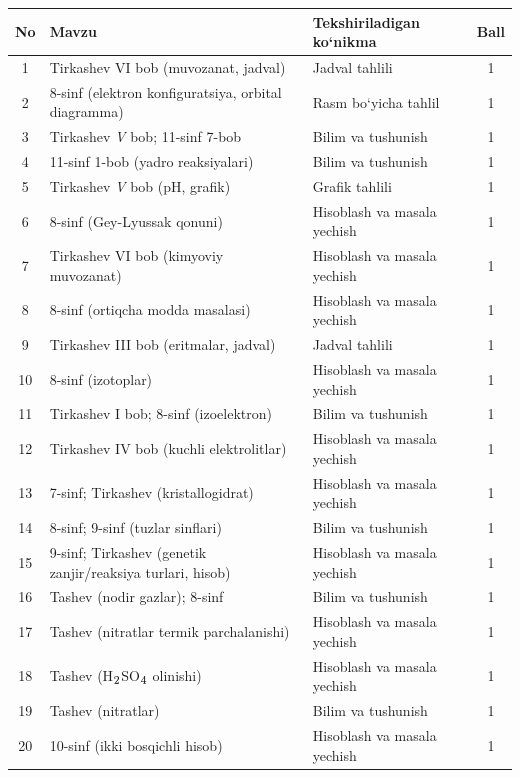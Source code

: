 \documentclass[11pt,a4paper]{article}
\renewcommand{\textsubscript}[1]{\ensuremath{_{\text{\fontsize{8}{8}\selectfont #1}}}}
\begin{document}
{\small\noindent\begin{longtable}{|c|p{7.2cm}|p{5.4cm}|c|}\hline \textbf{No} & \textbf{Mavzu} & \textbf{Tekshiriladigan ko`nikma} & \textbf{Ball}\\\hline
1 & Tirkashev VI bob (muvozanat, jadval) & Jadval tahlili & 1\\\hline
2 & 8-sinf (elektron konfiguratsiya, orbital diagramma) & Rasm bo`yicha tahlil & 1\\\hline
3 & Tirkashev \textit{V} bob; 11-sinf 7-bob & Bilim va tushunish & 1\\\hline
4 & 11-sinf 1-bob (yadro reaksiyalari) & Bilim va tushunish & 1\\\hline
5 & Tirkashev \textit{V} bob (pH, grafik) & Grafik tahlili & 1\\\hline
6 & 8-sinf (Gey-Lyussak qonuni) & Hisoblash va masala yechish & 1\\\hline
7 & Tirkashev VI bob (kimyoviy muvozanat) & Hisoblash va masala yechish & 1\\\hline
8 & 8-sinf (ortiqcha modda masalasi) & Hisoblash va masala yechish & 1\\\hline
9 & Tirkashev III bob (eritmalar, jadval) & Jadval tahlili & 1\\\hline
10 & 8-sinf (izotoplar) & Hisoblash va masala yechish & 1\\\hline
11 & Tirkashev I bob; 8-sinf (izoelektron) & Bilim va tushunish & 1\\\hline
12 & Tirkashev IV bob (kuchli elektrolitlar) & Hisoblash va masala yechish & 1\\\hline
13 & 7-sinf; Tirkashev (kristallogidrat) & Hisoblash va masala yechish & 1\\\hline
14 & 8-sinf; 9-sinf (tuzlar sinflari) & Bilim va tushunish & 1\\\hline
15 & 9-sinf; Tirkashev (genetik zanjir/reaksiya turlari, hisob) & Hisoblash va masala yechish & 1\\\hline
16 & Tashev (nodir gazlar); 8-sinf & Bilim va tushunish & 1\\\hline
17 & Tashev (nitratlar termik parchalanishi) & Hisoblash va masala yechish & 1\\\hline
18 & Tashev (H\textsubscript{2}SO\textsubscript{4} olinishi) & Hisoblash va masala yechish & 1\\\hline
19 & Tashev (nitratlar) & Bilim va tushunish & 1\\\hline
20 & 10-sinf (ikki bosqichli hisob) & Hisoblash va masala yechish & 1\\\hline

\end{longtable}}
\end{document}
